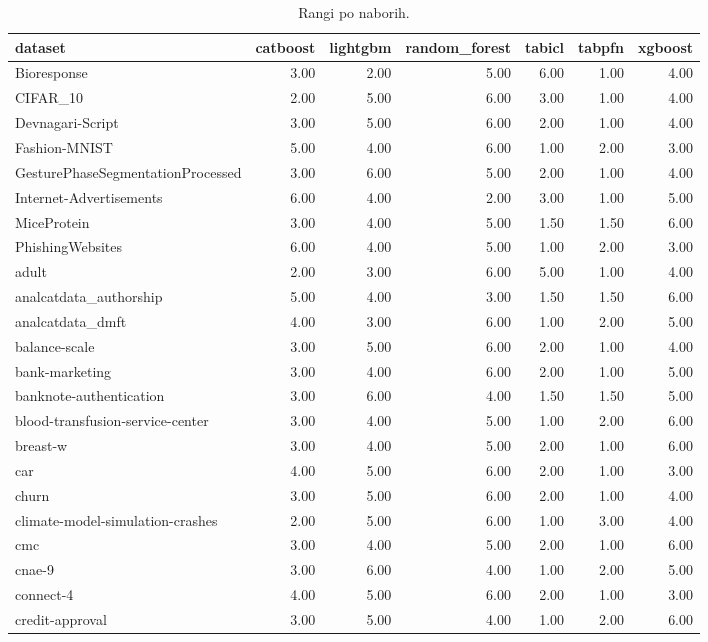 \begin{table}[htbp]
\centering
\caption{Rangi po naborih.}
\label{tab:ranks}
\begin{tabular}{lrrrrrr}
\hline
dataset & catboost & lightgbm & random\_forest & tabicl & tabpfn & xgboost \\
\hline
Bioresponse & 3.00 & 2.00 & 5.00 & 6.00 & 1.00 & 4.00 \\
CIFAR\_10 & 2.00 & 5.00 & 6.00 & 3.00 & 1.00 & 4.00 \\
Devnagari-Script & 3.00 & 5.00 & 6.00 & 2.00 & 1.00 & 4.00 \\
Fashion-MNIST & 5.00 & 4.00 & 6.00 & 1.00 & 2.00 & 3.00 \\
GesturePhaseSegmentationProcessed & 3.00 & 6.00 & 5.00 & 2.00 & 1.00 & 4.00 \\
Internet-Advertisements & 6.00 & 4.00 & 2.00 & 3.00 & 1.00 & 5.00 \\
MiceProtein & 3.00 & 4.00 & 5.00 & 1.50 & 1.50 & 6.00 \\
PhishingWebsites & 6.00 & 4.00 & 5.00 & 1.00 & 2.00 & 3.00 \\
adult & 2.00 & 3.00 & 6.00 & 5.00 & 1.00 & 4.00 \\
analcatdata\_authorship & 5.00 & 4.00 & 3.00 & 1.50 & 1.50 & 6.00 \\
analcatdata\_dmft & 4.00 & 3.00 & 6.00 & 1.00 & 2.00 & 5.00 \\
balance-scale & 3.00 & 5.00 & 6.00 & 2.00 & 1.00 & 4.00 \\
bank-marketing & 3.00 & 4.00 & 6.00 & 2.00 & 1.00 & 5.00 \\
banknote-authentication & 3.00 & 6.00 & 4.00 & 1.50 & 1.50 & 5.00 \\
blood-transfusion-service-center & 3.00 & 4.00 & 5.00 & 1.00 & 2.00 & 6.00 \\
breast-w & 3.00 & 4.00 & 5.00 & 2.00 & 1.00 & 6.00 \\
car & 4.00 & 5.00 & 6.00 & 2.00 & 1.00 & 3.00 \\
churn & 3.00 & 5.00 & 6.00 & 2.00 & 1.00 & 4.00 \\
climate-model-simulation-crashes & 2.00 & 5.00 & 6.00 & 1.00 & 3.00 & 4.00 \\
cmc & 3.00 & 4.00 & 5.00 & 2.00 & 1.00 & 6.00 \\
cnae-9 & 3.00 & 6.00 & 4.00 & 1.00 & 2.00 & 5.00 \\
connect-4 & 4.00 & 5.00 & 6.00 & 2.00 & 1.00 & 3.00 \\
credit-approval & 3.00 & 5.00 & 4.00 & 1.00 & 2.00 & 6.00 \\

\end{tabular}
\end{table}
